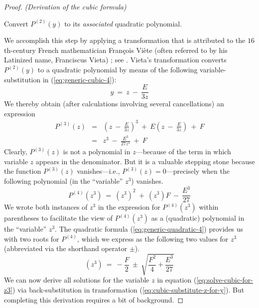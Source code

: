 \begin{proof} {\it (Derivation of the cubic formula)}
\medskip

 Convert $P^{(2)}(y)$ to its {\em associated} quadratic polynomial.

 

\noindent
We accomplish this step by applying a transformation that is attributed to the $16$th-century French mathematician Fran\c{c}ois Vi\`{e}te (often referred to by his Latinized name, Franciscus Vieta) ; see \cite{Hazewinkel}.  Vieta's transformation converts $P^{(2)}(y)$ to a quadratic polynomial by means of the following variable-substitution in (\ref{eq:generic-cubic-4}):
\begin{equation}
\label{eq:cubic-substitute-z-for-y}
y \ = \ z \ - \ \frac{E}{3z}
\end{equation}
We thereby obtain (after calculations involving several cancellations) an expression
\begin{eqnarray}
\nonumber
P^{(3)}(z) & = & \left( z \ - \ \frac{E}{3z} \right)^3
\ + \ E \left(z \ - \ \frac{E}{3z} \right) \ + \ F \\
\label{eq:generic-cubic-5}
  & = &
z^3 \ - \ \frac{E^3}{27z^3}  \ + \ F
\end{eqnarray}
Clearly, $P^{(3)}(z)$ is not a polynomial in $z$---because of the term in which variable $z$ appears in the denominator.  But it is a valuable stepping stone because the function $P^{(3)}(z)$ vanishes---i.e., $P^{(3)}(z) = 0$---precisely when the following polynomial (in the ``variable'' $z^3$) vanishes.
\[ P^{(4)}(z^3) \ = \ (z^3)^2 \ + \ (z^3) F \ - \ \frac{E^3}{27} \]
We wrote both instances of $z^3$ in the expression for $P^{(4)}(z^3)$ within parentheses to facilitate the view of $P^{(4)}(z^3)$ as a (quadratic) polynomial in the ``variable'' $z^3$.  The quadratic formula (\ref{eq:generic-quadratic-4}) provides us with two roots for $P^{(4)}$, which we express as the following two values for $z^3$ (abbreviated via the shorthand operator $\pm$).   
\begin{equation}
\label{eq:solve-cubic-for-z3}
(z^3) \ = \
- \frac{F}{2} \ \pm \ \sqrt{\frac{F^2}{4} + \frac{E^3}{27}}
\end{equation}
We can now derive all solutions for the variable $z$ in equation (\ref{eq:solve-cubic-for-z3}) via back-substitution in transformation (\ref{eq:cubic-substitute-z-for-y}).  But completing this derivation requires a bit of background.


\end{proof}
